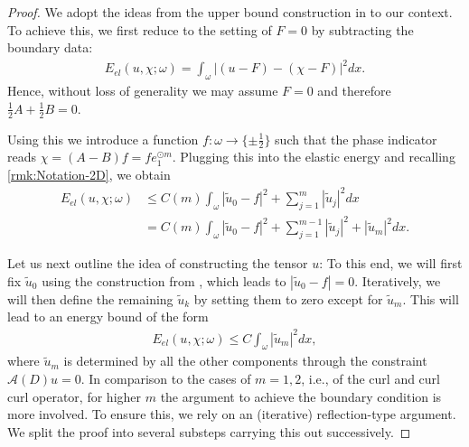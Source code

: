 \documentclass[a4paper, 10pt, twoside, notitlepage]{amsart}
\theoremstyle{plain}
\newcommand{\A}{\mathcal{A}}
\begin{document}
		\begin{proof}
			We adopt the ideas from the upper bound construction in \cite{CC15} to our context.  To achieve this, we first reduce to the setting of $F = 0$ by subtracting the boundary data:
			\begin{align*}
				E_{el}(u,\chi;\omega) = \int_{\omega} |(u-F) - (\chi-F)|^2 dx.
			\end{align*}
			Hence, without loss of generality we may assume $F = 0$ and therefore $\frac{1}{2}A+\frac{1}{2}B=0$.
			
			Using this we introduce a function $f:\omega \to \{\pm \frac{1}{2}\}$ such that the phase indicator reads $\chi = (A-B) f = f e_1^{\odot m}$.  Plugging this into the elastic energy and recalling \cref{rmk:Notation-2D}, we obtain
					\begin{align*}
                                          E_{el}(u,\chi;\omega) & \leq C(m) \int_\omega |\tilde{u}_0 -f|^2 + \sum_{j=1}^m |\tilde{u}_j|^2 dx \\
                                          & = C(m) \int_\omega |\tilde{u}_0 - f|^2 + \sum_{j=1}^{m-1} |\tilde{u}_j|^2 + |\tilde{u}_m|^2 dx.
			\end{align*}
			
			Let us next outline the idea of constructing the tensor $u$: To this end, we will first fix $\tilde{u}_0$ using the construction from \cite{CC15}, which leads to $|\tilde{u}_0 - f| =
			0$. Iteratively, we will then define the remaining $\tilde{u}_k$ by setting them to zero except for $\tilde{u}_m$.  This will lead to an energy bound of the form
			\begin{align*}
				E_{el}(u,\chi;\omega) \leq C \int_\omega |\tilde{u}_m|^2 dx,
			\end{align*}
			where $\tilde{u}_m$ is determined by all the other components through the constraint $\A(D) u = 0$.
                        In comparison to the cases of $m=1,2$, i.e., of the curl and curl curl operator, for higher $m$ the argument to achieve the boundary condition is more involved.
                        To ensure this, we rely on an (iterative) reflection-type argument. We split the proof into several substeps carrying this out successively.


\end{proof}
\end{document}
